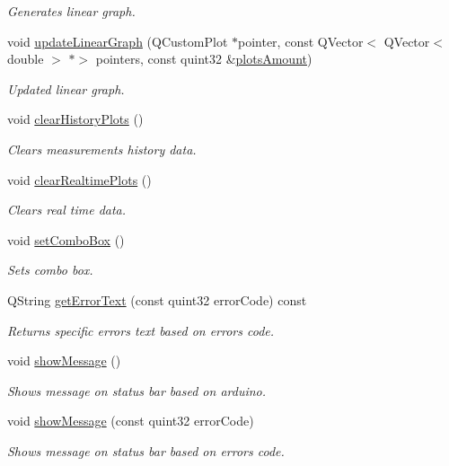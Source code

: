 \begin{DoxyCompactItemize}
\begin{DoxyCompactList}\small\item\em Generates linear graph. \end{DoxyCompactList}\item 
void \mbox{\hyperlink{class_main_window_a26aa34275169fb8830c03b47e97ff0ea}{update\+Linear\+Graph}} (Q\+Custom\+Plot $\ast$pointer, const Q\+Vector$<$ Q\+Vector$<$ double $>$ $\ast$$>$ pointers, const quint32 \&\mbox{\hyperlink{class_main_window_a390ce6d302bff7952eee7d92a6cf3da3}{plots\+Amount}})
\begin{DoxyCompactList}\small\item\em Updated linear graph. \end{DoxyCompactList}\item 
void \mbox{\hyperlink{class_main_window_ab7febfbc2493e928eea3beba33b4b6bb}{clear\+History\+Plots}} ()
\begin{DoxyCompactList}\small\item\em Clears measurements history data. \end{DoxyCompactList}\item 
void \mbox{\hyperlink{class_main_window_ae9a461c9fd369552f0e8871ec8f8f191}{clear\+Realtime\+Plots}} ()
\begin{DoxyCompactList}\small\item\em Clears real time data. \end{DoxyCompactList}\item 
void \mbox{\hyperlink{class_main_window_ad5f5900379db4ae670ad541da8f55384}{set\+Combo\+Box}} ()
\begin{DoxyCompactList}\small\item\em Sets combo box. \end{DoxyCompactList}\item 
Q\+String \mbox{\hyperlink{class_main_window_a5c8dccfe7131cf3c08ff9cbb9ff642d4}{get\+Error\+Text}} (const quint32 error\+Code) const
\begin{DoxyCompactList}\small\item\em Returns specific error\textquotesingle{}s text based on error\textquotesingle{}s code. \end{DoxyCompactList}\item 
void \mbox{\hyperlink{class_main_window_a366da6a45407c523f570ca9e4f4b40a4}{show\+Message}} ()
\begin{DoxyCompactList}\small\item\em Shows message on status bar based on arduino. \end{DoxyCompactList}\item 
void \mbox{\hyperlink{class_main_window_a365152de4a1878ab0087816da6a9431a}{show\+Message}} (const quint32 error\+Code)
\begin{DoxyCompactList}\small\item\em Shows message on status bar based on error\textquotesingle{}s code. \end{DoxyCompactList}\end{DoxyCompactItemize}
